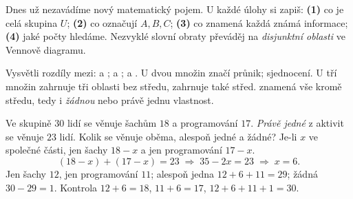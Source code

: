 \documentclass[11pt,a4paper]{article}
\begin{document}
Dnes už nezavádíme nový matematický pojem. U každé úlohy si zapiš:
\textbf{(1)} co je celá skupina $U$; \textbf{(2)} co označují
$A,B,C$; \textbf{(3)} co znamená každá známá informace;
\textbf{(4)} jaké počty hledáme. Nezvyklé slovní obraty převáděj na
\emph{disjunktní oblasti} ve Vennově diagramu.

\begin{zadaniReseniBox}[title={Samostatná práce 1},breakable=false]
Vysvětli rozdíly mezi:  a ;
 a ;  a .
\tcblower
U dvou množin  značí průnik;  sjednocení.
U tří množin  zahrnuje tři oblasti bez středu,
 zahrnuje také střed.  znamená
vše kromě středu, tedy i \emph{žádnou} nebo právě jednu vlastnost.
\end{zadaniReseniBox}

\begin{prikladReseniBox}[title={Příklad 1}]
Ve skupině $30$ lidí se věnuje šachům $18$ a programování $17$.
\emph{Právě jedné} z aktivit se věnuje $23$ lidí. Kolik se věnuje oběma,
alespoň jedné a žádné?
\tcblower
Je-li $x$ ve společné části, jen šachy $18-x$ a jen programování $17-x$.
\[
(18-x)+(17-x)=23\;\Rightarrow\;35-2x=23\;\Rightarrow\;x=6.
\]
Jen šachy $12$, jen programování $11$; alespoň jedna $12+6+11=29$;
žádná $30-29=1$. Kontrola $12+6=18$, $11+6=17$,
$12+6+11+1=30$.
\end{prikladReseniBox}
\end{document}
